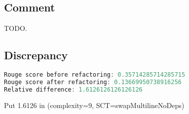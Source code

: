 \documentclass[11pt]{article}
\begin{document}
\subsection{Comment}

TODO.

\subsection{Discrepancy}

\begin{lstlisting}[language=java]
Rouge score before refactoring: 0.35714285714285715
Rouge score after refactoring: 0.13669950738916256
Relative difference: 1.6126126126126126
\end{lstlisting}

Put 1.6126 in (complexity=9, SCT=swapMultilineNoDeps)
\end{document}
